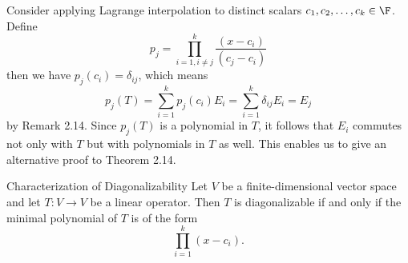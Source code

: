\documentclass[math_245.tex]{subfiles}
\begin{document}
    \begin{remark}
        Consider applying Lagrange interpolation to distinct scalars $c_1, c_2, \ldots, c_k\in \F$. Define
        \begin{equation*}
            p_j = \prod^{k}_{i=1,i\neq j} \frac{(x-c_i)}{(c_j-c_i)}
        \end{equation*}
        then we have $p_j(c_i) = \delta_{ij}$, which means
        \begin{equation*}
            p_j(T) = \sum^{k}_{i=1} p_j(c_i)E_i = \sum^{k}_{i=1} \delta_{ij}E_i = E_j
        \end{equation*}
        by Remark 2.14. Since $p_j(T)$ is a polynomial in $T$, it follows that $E_i$ commutes not only with $T$ but with polynomials in $T$ as well. This enables us to give an alternative proof to Theorem 2.14.
    \end{remark}

    \setcounter{stcounter}{13}
    \begin{theorem}{Characterization of Diagonalizability}
        Let $V$ be a finite-dimensional vector space and let $T:V\to V$ be a linear operator. Then $T$ is diagonalizable if and only if the minimal polynomial of $T$ is of the form
        \begin{equation*}
            \prod^{k}_{i=1} (x-c_i).
        \end{equation*}
    \end{theorem}
    \setcounter{stcounter}{19}
\end{document}
